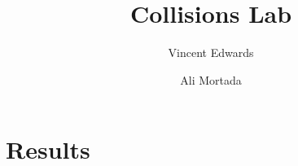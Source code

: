 \documentclass[12pt]{iopart} %
\title{Collisions Lab}
\author{Vincent Edwards}
\author{Ali Mortada}
\begin{document}
\section{Results}
\end{document}
